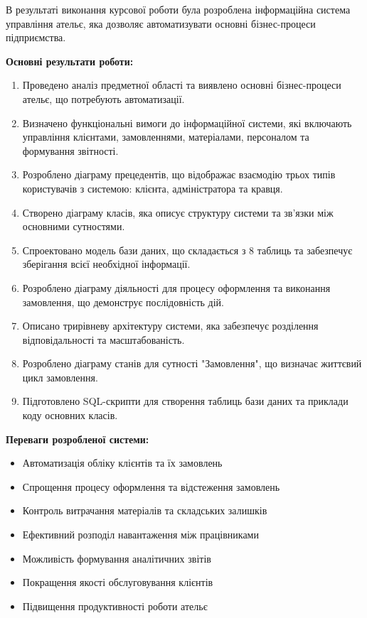 \documentclass[14pt,a4paper]{extarticle}
\begin{document}
В результаті виконання курсової роботи була розроблена інформаційна система управління ательє, яка дозволяє автоматизувати основні бізнес-процеси підприємства.

\textbf{Основні результати роботи:}

\begin{enumerate}
    \item Проведено аналіз предметної області та виявлено основні бізнес-процеси ательє, що потребують автоматизації.
    
    \item Визначено функціональні вимоги до інформаційної системи, які включають управління клієнтами, замовленнями, матеріалами, персоналом та формування звітності.
    
    \item Розроблено діаграму прецедентів, що відображає взаємодію трьох типів користувачів з системою: клієнта, адміністратора та кравця.
    
    \item Створено діаграму класів, яка описує структуру системи та зв'язки між основними сутностями.
    
    \item Спроектовано модель бази даних, що складається з 8 таблиць та забезпечує зберігання всієї необхідної інформації.
    
    \item Розроблено діаграму діяльності для процесу оформлення та виконання замовлення, що демонструє послідовність дій.
    
    \item Описано трирівневу архітектуру системи, яка забезпечує розділення відповідальності та масштабованість.
    
    \item Розроблено діаграму станів для сутності "Замовлення", що визначає життєвий цикл замовлення.
    
    \item Підготовлено SQL-скрипти для створення таблиць бази даних та приклади коду основних класів.
\end{enumerate}

\textbf{Переваги розробленої системи:}

\begin{itemize}
    \item Автоматизація обліку клієнтів та їх замовлень
    \item Спрощення процесу оформлення та відстеження замовлень
    \item Контроль витрачання матеріалів та складських залишків
    \item Ефективний розподіл навантаження між працівниками
    \item Можливість формування аналітичних звітів
    \item Покращення якості обслуговування клієнтів
    \item Підвищення продуктивності роботи ательє
\end{itemize}
\end{document}
